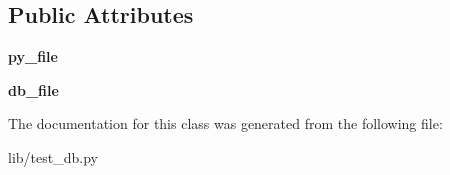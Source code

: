 \subsection*{Public Attributes}
\begin{DoxyCompactItemize}
\item 
\mbox{\label{classCBGM_1_1lib_1_1test__db_1_1TestDatabase_a567e6a237777c58b38b078b6019eac9e}} 
{\bfseries py\+\_\+file}
\item 
\mbox{\label{classCBGM_1_1lib_1_1test__db_1_1TestDatabase_a7c09c633b1487c49fab0bae4361622ec}} 
{\bfseries db\+\_\+file}
\end{DoxyCompactItemize}


The documentation for this class was generated from the following file\+:\begin{DoxyCompactItemize}
\item 
lib/test\+\_\+db.\+py\end{DoxyCompactItemize}
